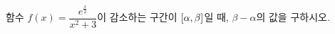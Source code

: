 함수 $f(x)=\dfrac{e^{\frac{x}{2}}}{x^2+3}$이 감소하는 구간이 $[\alpha{,}\mkern3mu\mathopen{}\beta]$일 때, $\beta-\alpha$의 값을 구하시오.
